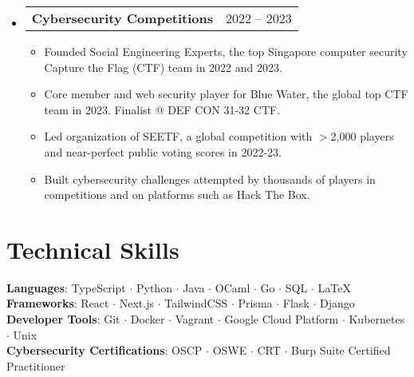 \documentclass[letterpaper,10pt]{article}
\makeatletter
\newcommand{\resumeItem}[1]{
  \item\small{
    {#1 \vspace{-2pt}}
  }
}
\newcommand{\resumeProjectHeading}[2]{
  \item
  \begin{tabular*}{0.97\textwidth}{l@{\extracolsep{\fill}}r}
    \small#1 & #2 \\
  \end{tabular*}\vspace{-7pt}
}
\newenvironment{resumeSubHeadingList}{\begin{itemize}[leftmargin=0.15in, label={}]}{\end{itemize}}
\newenvironment{resumeItemList}{\begin{itemize}}{\end{itemize}}
\makeatother
\begin{document}
\begin{resumeSubHeadingList}
  \resumeProjectHeading{\textbf{Cybersecurity Competitions}}{2022 -- 2023}
  \begin{resumeItemList}
    \resumeItem{Founded Social Engineering Experts, the top Singapore computer
                security Capture the Flag (CTF) team in 2022 and 2023.}
    \resumeItem{Core member and web security player for Blue Water, the global
                top CTF team in 2023. Finalist @ DEF CON 31-32 CTF. }
    \resumeItem{Led organization of SEETF, a global competition with $>$2,000
                players and near-perfect public voting scores in 2022-23.}
    \resumeItem{Built cybersecurity challenges attempted by thousands of
                players in competitions and on platforms such as Hack The Box.}
  \end{resumeItemList}
\end{resumeSubHeadingList}

\section{Technical Skills}
\begin{itemize}[leftmargin=0.15in, label={}]
  \small{\item{
        \textbf{Languages}{: TypeScript $\cdot$ Python $\cdot$ Java $\cdot$ OCaml $\cdot$ Go $\cdot$ SQL $\cdot$ \LaTeX} \\
        \textbf{Frameworks}{: React $\cdot$  Next.js $\cdot$ TailwindCSS $\cdot$  Prisma $\cdot$ Flask $\cdot$ Django} \\
        \textbf{Developer Tools}{: Git $\cdot$ Docker $\cdot$  Vagrant $\cdot$ Google Cloud Platform $\cdot$ Kubernetes $\cdot$ Unix} \\
        \textbf{Cybersecurity Certifications}{: OSCP $\cdot$ OSWE $\cdot$ CRT $\cdot$ Burp Suite Certified Practitioner}
        }}
\end{itemize}
\end{document}

